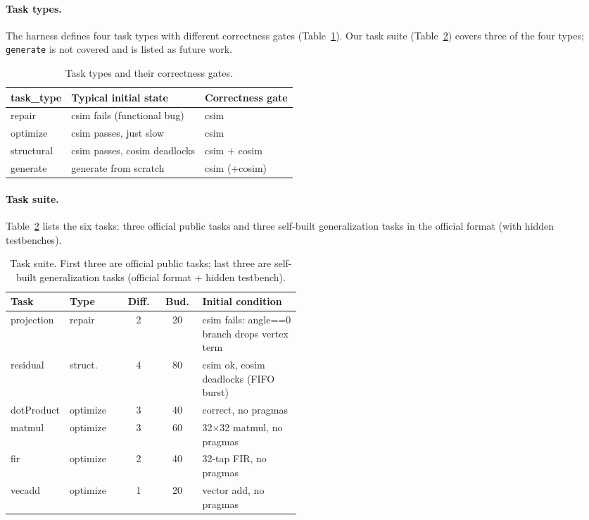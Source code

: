 \documentclass[10pt,conference,letterpaper]{IEEEtran}
\begin{document}
\paragraph{Task types.} The harness defines four task types with different correctness gates (Table~\ref{tab:tasktypes}). Our task suite (Table~\ref{tab:tasks}) covers three of the four types; \texttt{generate} is not covered and is listed as future work.

\begin{table}[h]
\centering
\caption{Task types and their correctness gates.}
\label{tab:tasktypes}
\small
\begin{tabular}{lll}
\toprule
\textbf{task\_type} & \textbf{Typical initial state} & \textbf{Correctness gate} \\
\midrule
repair & csim fails (functional bug) & csim \\
optimize & csim passes, just slow & csim \\
structural & csim passes, cosim deadlocks & csim + cosim \\
generate & generate from scratch & csim (+cosim) \\
\bottomrule
\end{tabular}
\end{table}

\paragraph{Task suite.} Table~\ref{tab:tasks} lists the six tasks: three official public tasks and three self-built generalization tasks in the official format (with hidden testbenches).

\begin{table}[h]
\centering
\caption{Task suite. First three are official public tasks; last three are self-built generalization tasks (official format + hidden testbench).}
\label{tab:tasks}
\small
\begin{tabular}{>{\raggedright\arraybackslash}p{0.14\linewidth} l c c p{0.34\linewidth}}
\toprule
\textbf{Task} & \textbf{Type} & \textbf{Diff.} & \textbf{Bud.} & \textbf{Initial condition} \\
\midrule
projection & repair & 2 & 20 & csim fails: angle==0 branch drops vertex term \\
residual & struct. & 4 & 80 & csim ok, cosim deadlocks (FIFO burst) \\
dotProduct & optimize & 3 & 40 & correct, no pragmas \\
matmul & optimize & 3 & 60 & 32$\times$32 matmul, no pragmas \\
fir & optimize & 2 & 40 & 32-tap FIR, no pragmas \\
vecadd & optimize & 1 & 20 & vector add, no pragmas \\
\bottomrule
\end{tabular}
\end{table}
\end{document}
